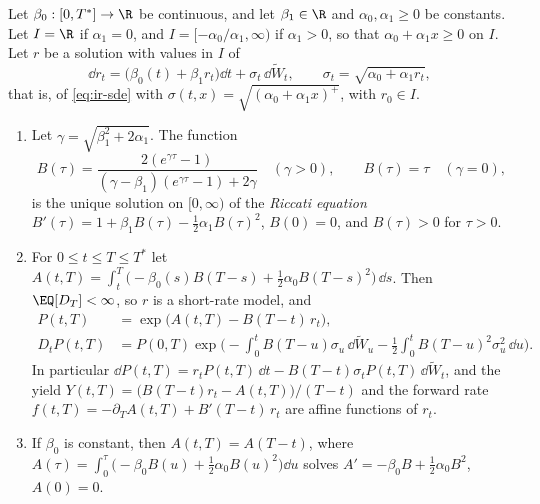\begin{theorem}\label{thm:ir-affine}
Let $\beta_0:[0,T^*]\to\R$ be continuous, and let $\beta_1\in\R$ and $\alpha_0,\alpha_1\ge0$ be
constants. Let $I=\R$ if $\alpha_1=0$, and $I=[-\alpha_0/\alpha_1,\infty)$ if
$\alpha_1>0$, so that $\alpha_0+\alpha_1x\ge0$ on $I$. Let $r$ be a solution with values in $I$ of
\begin{equation}\label{eq:ir-affine-sde}
  \dd r_t=\big(\beta_0(t)+\beta_1r_t\big)\dd t+\sigma_t\,\dd\widetilde W_t,\qquad
  \sigma_t=\sqrt{\alpha_0+\alpha_1r_t},
\end{equation}
that is, of \eqref{eq:ir-sde} with $\sigma(t,x)=\sqrt{(\alpha_0+\alpha_1x)^+}$, with $r_0\in I$.
\begin{enumerate}[label=(\roman*)]
  \item Let $\gamma=\sqrt{\beta_1^2+2\alpha_1}$. The function
    \begin{equation}\label{eq:ir-riccati-B}
      B(\tau)=\frac{2(e^{\gamma\tau}-1)}{(\gamma-\beta_1)(e^{\gamma\tau}-1)+2\gamma}\quad(\gamma>0),
      \qquad B(\tau)=\tau\quad(\gamma=0),
    \end{equation}
    is the unique solution on $[0,\infty)$ of the \emph{Riccati equation}
    $B'(\tau)=1+\beta_1B(\tau)-\frac12\alpha_1B(\tau)^2$, $B(0)=0$, and $B(\tau)>0$ for $\tau>0$.
  \item For $0\le t\le T\le T^*$ let
    $A(t,T)=\int_t^T\big(-\beta_0(s)B(T-s)+\frac12\alpha_0B(T-s)^2\big)\,\dd s$. Then
    $\EQ[D_T]<\infty$, so $r$ is a short-rate model, and
    \begin{align}
      P(t,T)&=\exp\big(A(t,T)-B(T-t)\,r_t\big),\label{eq:ir-affine}\\
      D_tP(t,T)&=P(0,T)\exp\Big(-\int_0^tB(T-u)\sigma_u\,\dd\widetilde W_u-\frac12\int_0^tB(T-u)^2\sigma_u^2\,\dd u\Big).
      \label{eq:ir-affine-density}
    \end{align}
    In particular $\dd P(t,T)=r_tP(t,T)\,\dd t-B(T-t)\sigma_tP(t,T)\,\dd\widetilde W_t$, and the
    yield $Y(t,T)=\big(B(T-t)r_t-A(t,T)\big)/(T-t)$ and the forward rate
    $f(t,T)=-\partial_TA(t,T)+B'(T-t)\,r_t$ are affine functions of $r_t$.
  \item If $\beta_0$ is constant, then $A(t,T)=A(T-t)$, where $A(\tau)=\int_0^\tau\big(-\beta_0B(u)+\frac12\alpha_0B(u)^2\big)\dd u$
    solves $A'=-\beta_0B+\frac12\alpha_0B^2$, $A(0)=0$.
\end{enumerate}
\end{theorem}


